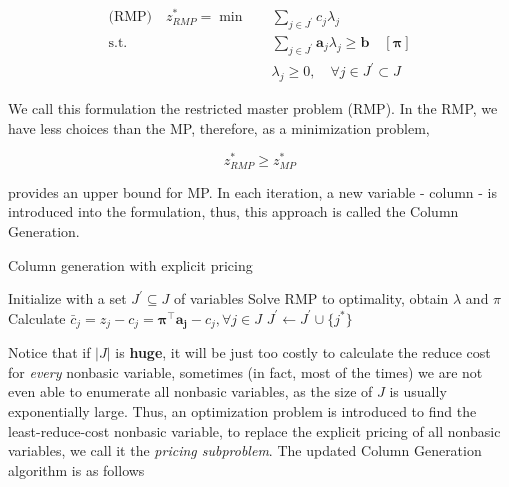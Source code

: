             \begin{align*}
                \text{(RMP)} \quad  z_{RMP}^* = \min \quad & \sum_{j \in J^\prime} c_j \lambda_j\\
                \text{s.t.} \quad & \sum_{j \in J^\prime} \mathbf{a}_j \lambda_j \ge \mathbf{b} \quad [\mathbf{\pi}]\\
                &\lambda_j \ge 0, \quad \forall j \in J^\prime \subset J
            \end{align*}

            We call this formulation the restricted master problem (RMP). In the RMP, we have less choices than the MP, therefore, as a minimization problem, 

            \begin{equation*}
                z_{RMP}^* \ge z_{MP}^*
            \end{equation*}

            provides an upper bound for MP. In each iteration, a new variable - column - is introduced into the formulation, thus, this approach is called the Column Generation.

            \begin{algorithm}[!htp]
                \centering
                \caption{Column generation with explicit pricing}
                \begin{algorithmic}
                    \State Initialize with a set $J^\prime \subseteq J$ of variables
                    \Repeat
                        \State Solve RMP to optimality, obtain $\lambda$ and $\pi$
                        \State Calculate $\bar{c}_j = z_j - c_j = \mathbf{\pi^\top a_j} - c_j, \forall j \in J$
                            \State $J^\prime \gets J^\prime \cup \{j^*\}$
                        \EndIf
                \end{algorithmic}
            \end{algorithm}
            
            Notice that if $|J|$ is \textbf{huge}, it will be just too costly to calculate the reduce cost for \textit{every} nonbasic variable, sometimes (in fact, most of the times) we are not even able to enumerate all nonbasic variables, as the size of $J$ is usually exponentially large. Thus, an optimization problem is introduced to find the least-reduce-cost nonbasic variable, to replace the explicit pricing of all nonbasic variables, we call it the \textit{pricing subproblem}. The updated Column Generation algorithm is as follows


